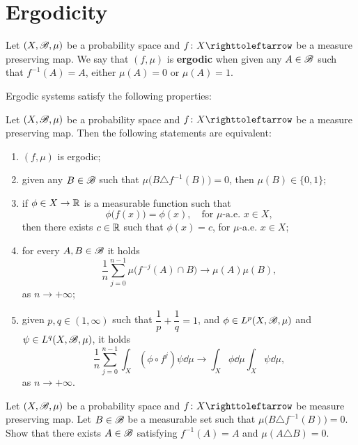 \section{Ergodicity}\label{sec:ergodicity}

Let $(X,\mathscr{B},\mu)$ be a probability space and $f\colon X\carr$ be a measure preserving map. We say that $(f,\mu)$ is \textbf{ergodic} when given any $A\in\mathscr{B}$ such that $f^{-1}(A)=A$, either $\mu(A)=0$ or $\mu(A)=1$.

Ergodic systems satisfy the following properties:

\begin{theorem}\label{thm:ergodicty-equivalent-definitions}
  Let $(X,\mathscr{B},\mu)$ be a probability space and $f\colon X\carr$ be a measure preserving map. Then the following statements are equivalent:
  \begin{enumerate}
    \item $(f,\mu)$ is ergodic;
    \item given any $B\in\mathscr{B}$ such that $\mu\big(B\triangle f^{-1}(B)\big)=0$, then $\mu(B)\in\{0,1\}$;
    \item if $\phi\in X\to\mathbb{R}$ is a measurable function such that
          \begin{displaymath}
            \phi\big(f(x)\big)=\phi(x), \quad\text{for }\mu\text{-a.e. }x\in X,
          \end{displaymath}
          then there exists $c\in\mathbb{R}$ such that $\phi(x)=c$, for $\mu$-a.e. $x\in X$;
    \item for every $A,B\in\mathscr{B}$ it holds
          \begin{displaymath}
            \frac{1}{n}\sum_{j=0}^{n-1}\mu\big(f^{-j}(A)\cap B) \to\mu(A)\mu(B),
          \end{displaymath}
          as $n\to+\infty$;
    \item given $p,q\in (1,\infty)$ such that $\dfrac{1}{p}+\dfrac{1}{q}=1$, and $\phi\in L^{p}(X,\mathscr{B},\mu)$ and $\psi\in L^{q}(X,\mathscr{B},\mu)$, it holds
          \begin{displaymath}
            \frac{1}{n}\sum_{j=0}^{n-1}\int_{X}(\phi\circ f^{j})\psi\dd\mu \to\int_{X}\phi\dd\mu \int_{X}\psi\dd\mu,
          \end{displaymath}
          as $n\to+\infty$.
  \end{enumerate}
\end{theorem}

\begin{exercise}\label{exer:essentially-invariant-set-implies-invariant}
  Let $(X,\mathscr{B},\mu)$ be a probability space and $f\colon X\carr$ be measure preserving map. Let $B\in\mathscr{B}$ be a measurable set such that $\mu\big(B\triangle f^{-1}(B)\big)=0$. Show that there exists $A\in\mathscr{B}$ satisfying $f^{-1}(A)=A$ and $\mu(A\triangle B)=0$.
\end{exercise}

